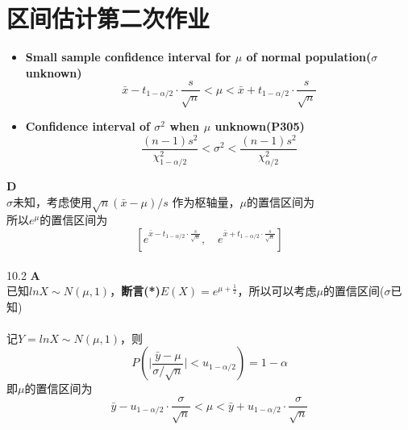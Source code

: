 \documentclass[a4paper]{ctexart}    %
\begin{document}
	\section{区间估计第二次作业} 
	\begin{tcolorbox}
		[
		colframe=blue!25,
		colback=blue!10,
		coltitle=blue!20!black,  
		fonttitle=\bfseries,
		adjusted title=Formula Or Theorem:
		]
		\begin{itemize}
			\item \textbf{Small sample confidence interval for $ \mu $ of normal population($\sigma$ unknown)}
			\begin{equation*}
				\bar{x} - t_{1-\alpha/2} \cdot \frac{s}{\sqrt{n}} < \mu < \bar{x} + t_{1-\alpha/2} \cdot \frac{s}{\sqrt{n}}
			\end{equation*}
			\item \textbf{Confidence interval of $ \sigma^2 $ when $ \mu $ unknown(P305)} 
			\begin{equation*}
				\frac{(n-1)s^2}{\chi_{1-\alpha/2}^{2}}< \sigma^2 < \frac{(n-1)s^2}{\chi_{\alpha/2}^{2}}
			\end{equation*}
		\end{itemize}
	\end{tcolorbox}
	 \quad \textbf{D} \\
	$\sigma$未知，考虑使用$ \sqrt{n} (\bar{x} - \mu) / s $ 作为枢轴量，$\mu$的置信区间为
	\begin{equation*}
		[\bar{x} - t_{1-\alpha/2} \cdot \frac{s}{\sqrt{n}},\quad \bar{x} + t_{1-\alpha/2} \cdot \frac{s}{\sqrt{n}}]
	\end{equation*}
	所以$ e^{\mu} $的置信区间为
	\begin{equation*}
		\left[e^{\bar{x} - t_{1-\alpha/2} \cdot \frac{s}{\sqrt{n}}}, \quad e^{\bar{x} + t_{1-\alpha/2} \cdot \frac{s}{\sqrt{n}}}\right]
	\end{equation*}
	\\
	10.2 \quad \textbf{A} \\
	已知$ lnX \sim N(\mu, 1) $，\textbf{断言(*)}$ E(X) = e^{\mu + \frac{1}{2}} $，所以可以考虑$\mu$的置信区间($\sigma$已知) \\ \\
	记$ Y = lnX \sim N(\mu, 1) $，则
	\begin{equation*}
		P\left(\bigg|\frac{\bar{y}-\mu}{\sigma/\sqrt{n}}\bigg| < u_{1-\alpha/2} \right) = 1 - \alpha
	\end{equation*}
	即$\mu$的置信区间为
	\begin{equation*}
		\bar{y} - u_{1-\alpha/2} \cdot \frac{\sigma}{\sqrt{n}} < \mu < \bar{y} + u_{1-\alpha/2} \cdot \frac{\sigma}{\sqrt{n}}
	\end{equation*}
\end{document}
